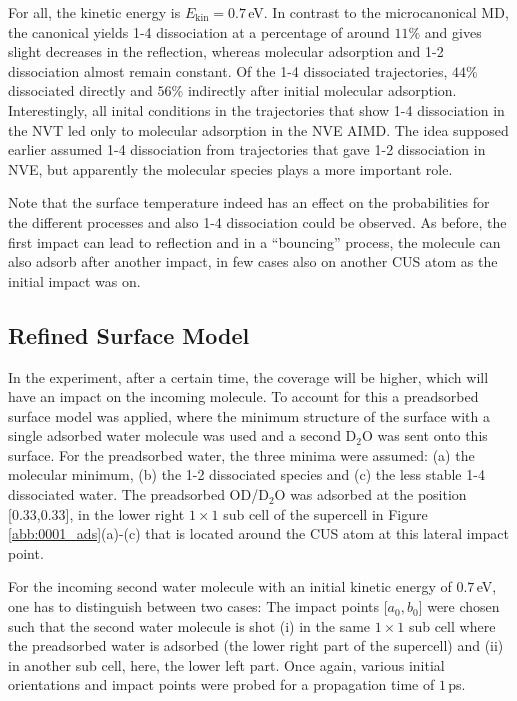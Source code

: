 \documentclass[11pt,DIV=13,BCOR=5mm,a4paper,headinclude]{scrbook}
\begin{document}
For all, the kinetic energy is $E_\textrm{kin}=0.7\,$eV.
In contrast to the microcanonical MD, the canonical yields 1-4 dissociation at a percentage of around $11\%$ and gives slight decreases in the reflection, whereas molecular adsorption and 1-2 dissociation almost remain constant.
Of the 1-4 dissociated trajectories, $44\%$ dissociated directly and $56\%$ indirectly after initial molecular adsorption.
Interestingly, all inital conditions in the trajectories that show 1-4 dissociation in the NVT led only to molecular adsorption in the NVE AIMD.
The idea supposed earlier assumed 1-4 dissociation from trajectories that gave 1-2 dissociation in NVE, but apparently the molecular species plays a more important role.


Note that the surface temperature indeed has an effect on the probabilities for the different processes and also 1-4 dissociation could be observed.
As before, the first impact can lead to reflection and in a ``bouncing'' process, the molecule can also adsorb after another impact, in few cases also on another CUS atom as the initial impact was on.
 
\subsection{Refined Surface Model}
In the experiment, after a certain time, the coverage will be higher, which will have an impact on the incoming molecule.
To account for this a preadsorbed surface model was applied, where the minimum structure of the surface with a single adsorbed water molecule was used and a second D$_2$O was sent onto this surface.
For the preadsorbed water, the three minima were assumed: (a) the molecular minimum, (b) the 1-2 dissociated species and (c) the less stable 1-4 dissociated water.
The preadsorbed OD/D$_2$O was adsorbed at the position [0.33,0.33], in the lower right $1\times 1$ sub cell of the supercell in Figure \ref{abb:0001_ads}(a)-(c) that is located around the CUS atom at this lateral impact point.


For the incoming second water molecule with an initial kinetic energy of $0.7\,$eV, one has to distinguish between two cases:
The impact points [$a_0,b_0$] were chosen such that the second water molecule is shot (i) in the same $1\times 1$ sub cell where the preadsorbed water is adsorbed (the lower right part of the supercell) and (ii) in another sub cell, here, the lower left part.
Once again, various initial orientations and impact points were probed for a propagation time of $1\,$ps.
\end{document}
